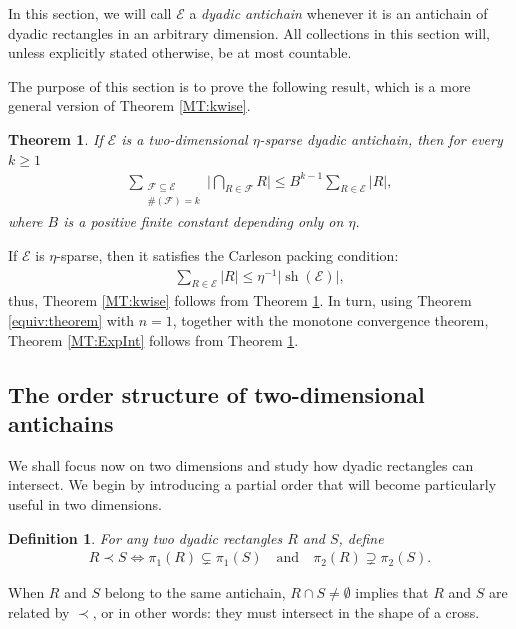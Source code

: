 \documentclass[oneside]{amsart}
\newtheorem*{definition*}{Definition}
\newtheorem{theorem}{Theorem}
\theoremstyle{definition}
\theoremstyle{plain}
\numberwithin{equation}{section}
\numberwithin{theorem}{section}
\newcommand{\sh}{\operatorname{sh}}
\begin{document}
In this section, we will call $\mathcal{E}$ a \emph{dyadic antichain} whenever
it is an antichain of dyadic rectangles in an arbitrary dimension.
All collections in this section will, unless explicitly stated otherwise, be at
most countable.

The purpose of this section is to prove the following result,
which is a more general version of Theorem \ref{MT:kwise}.

\begin{theorem} \label{kwise:precise}
  If $\mathcal{E}$ is a two-dimensional $\eta$-sparse dyadic antichain, then
  for every $k \geq 1$
  \begin{align} \label{kwise:ineq}
    \sum_{\substack{\mathcal{F} \subseteq \mathcal{E} \\
      \#(\mathcal{F}) = k
    }} \Big|
      \bigcap_{R \in \mathcal{F}} R
    \Big|
    \leq B^{k-1} \sum_{R \in \mathcal{E}} |R|,
  \end{align}
  where $B$ is a positive finite constant depending only on $\eta$.
\end{theorem}
If $\mathcal{E}$ is $\eta$-sparse, then it satisfies the Carleson packing
condition:
\begin{align*}
  \sum_{R \in \mathcal{E}} |R| \leq \eta^{-1} |\sh(\mathcal{E})|,
\end{align*}
thus, Theorem \ref{MT:kwise} follows from Theorem \ref{kwise:precise}.
In turn, using Theorem \ref{equiv:theorem} with $n=1$, together with the
monotone convergence theorem, Theorem \ref{MT:ExpInt}
follows from Theorem \ref{kwise:precise}.


\subsection{The order structure of two-dimensional antichains}

We shall focus now on two dimensions and study how dyadic rectangles can
intersect. We begin by introducing a partial order that will become particularly
useful in two dimensions.
\begin{definition*}
  For any two dyadic rectangles $R$ and $S$, define
  \begin{align*}
    R \prec S \iff \pi_1(R) \subsetneq \pi_1(S)
    \quad\text{and}\quad
    \pi_2(R) \supsetneq \pi_2(S).
  \end{align*}
\end{definition*}
When $R$ and $S$ belong to the same antichain, $R \cap S \neq \emptyset$ implies
that $R$ and $S$ are related by $\prec$, or in other words:
they must intersect in the shape of a cross.
\end{document}
